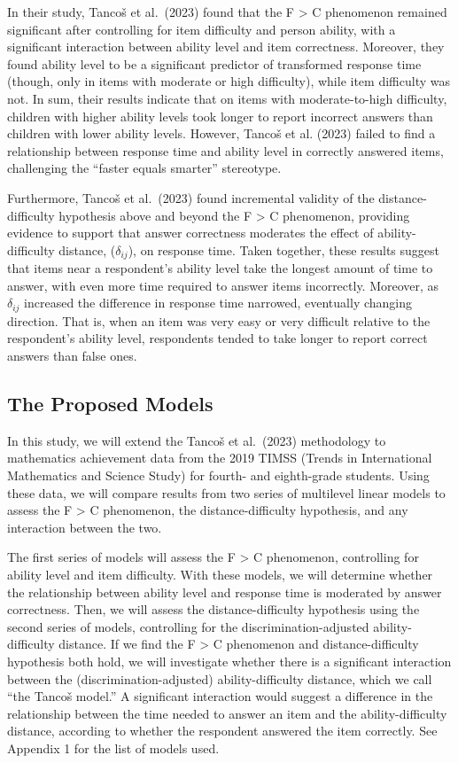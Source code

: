\documentclass[
  number]{elsarticle}
\begin{document}
In their study, Tancoš et al.~(2023) found that the F \textgreater{} C
phenomenon remained significant after controlling for item difficulty
and person ability, with a significant interaction between ability level
and item correctness. Moreover, they found ability level to be a
significant predictor of transformed response time (though, only in
items with moderate or high difficulty), while item difficulty was not.
In sum, their results indicate that on items with moderate-to-high
difficulty, children with higher ability levels took longer to report
incorrect answers than children with lower ability levels. However,
Tancoš et al. (2023) failed to find a relationship between response time
and ability level in correctly answered items, challenging the ``faster
equals smarter'' stereotype.

Furthermore, Tancoš et al.~(2023) found incremental validity of the
distance-difficulty hypothesis above and beyond the F \textgreater{} C
phenomenon, providing evidence to support that answer correctness
moderates the effect of ability-difficulty distance, (\(\delta_{ij}\)),
on response time. Taken together, these results suggest that items near
a respondent's ability level take the longest amount of time to answer,
with even more time required to answer items incorrectly. Moreover, as
\(\delta_{ij}\) increased the difference in response time narrowed,
eventually changing direction. That is, when an item was very easy or
very difficult relative to the respondent's ability level, respondents
tended to take longer to report correct answers than false ones.

\subsection{The Proposed Models}\label{the-proposed-models}

In this study, we will extend the Tancoš et al.~(2023) methodology to
mathematics achievement data from the 2019 TIMSS (Trends in
International Mathematics and Science Study) for fourth- and
eighth-grade students. Using these data, we will compare results from
two series of multilevel linear models to assess the F \textgreater{} C
phenomenon, the distance-difficulty hypothesis, and any interaction
between the two.

The first series of models will assess the F \textgreater{} C
phenomenon, controlling for ability level and item difficulty. With
these models, we will determine whether the relationship between ability
level and response time is moderated by answer correctness. Then, we
will assess the distance-difficulty hypothesis using the second series
of models, controlling for the discrimination-adjusted
ability-difficulty distance. If we find the F \textgreater{} C
phenomenon and distance-difficulty hypothesis both hold, we will
investigate whether there is a significant interaction between the
(discrimination-adjusted) ability-difficulty distance, which we call
``the Tancoš model.'' A significant interaction would suggest a
difference in the relationship between the time needed to answer an item
and the ability-difficulty distance, according to whether the respondent
answered the item correctly. See Appendix 1 for the list of models used.
\end{document}
